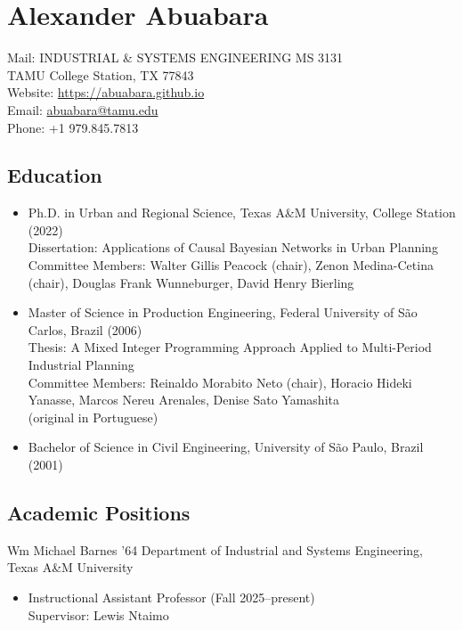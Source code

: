 \documentclass[11pt,oneside]{article}
\begin{document}
\pagestyle{firstpage}
\raggedright

\section*{Alexander Abuabara}
Mail: INDUSTRIAL \& SYSTEMS ENGINEERING MS 3131\\
\hspace{0.9cm} TAMU College Station, TX 77843\\[1pt]
Website: \url{https://abuabara.github.io}\\[1pt]
Email: \href{abuabara@tamu.edu}{abuabara@tamu.edu}\\[1pt]
Phone: +1 979.845.7813

\subsection*{Education}
\begin{itemize}[leftmargin=20pt]
\item Ph.D. in Urban and Regional Science, Texas A\&M University, College Station (2022)\\[1pt]
      Dissertation: Applications of Causal Bayesian Networks in Urban Planning\\[1pt]
      Committee Members: Walter Gillis Peacock (chair), Zenon Medina-Cetina (chair), Douglas Frank Wunneburger, David Henry Bierling
\item Master of Science in Production Engineering, Federal University of São Carlos, Brazil (2006)\\[1pt]
      Thesis: A Mixed Integer Programming Approach Applied to Multi-Period Industrial Planning\\[1pt]
      Committee Members: Reinaldo Morabito Neto (chair), Horacio Hideki Yanasse, Marcos Nereu Arenales, Denise Sato Yamashita\\[0pt]
      {\small (original in Portuguese)}
\item Bachelor of Science in Civil Engineering, University of São Paulo, Brazil (2001)
\end{itemize}

\subsection*{Academic Positions}
{Wm Michael Barnes ’64 Department of Industrial and Systems Engineering, Texas A\&M University}
\begin{itemize}[leftmargin=20pt]
\item Instructional Assistant Professor (Fall 2025--present)\\
      Supervisor: Lewis Ntaimo
\end{itemize}
\end{document}
